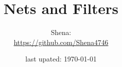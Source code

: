 \documentclass[a4paper,12pt]{article}
\begin{document}
\title{Nets and Filters}
\author{Shena:\\ \url{https://github.com/Shena4746}}
\date{last upated: \today}
\maketitle
\end{document}
